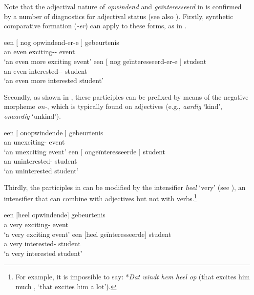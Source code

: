 \documentclass[output=paper]{langsci/langscibook}
\begin{document}
Note that the adjectival nature of \emph{opwindend} and \emph{geïnteresseerd}
in  is confirmed by a number of diagnostics for adjectival
status (see also \citealt{Broekhuis2013}). Firstly, synthetic comparative
formation (\emph{-er}) can apply to these forms, as in .

\ea%
    \label{ex:key:18.27}
	\ea
	\gll  een [ nog    opwindend-er-e ]            gebeurtenis\\
    an {} even    exciting-\Cmpr-\Agr{} {} event\\
	\glt ‘an even more exciting event’
	\ex
	\gll  een  [ nog  geïnteresseerd-er-e ]        student\\
    an {} even  interested-\Cmpr-\Agr{} {}  student\\
	\glt ‘an even more interested student’
	\z
\z

Secondly, as shown in , these participles can be prefixed by
means of the negative morpheme \emph{on-}, which is typically found on
adjectives (e.g., \emph{aardig} \enquote*{kind}, \emph{onaardig}
\enquote*{unkind}).\newpage

\ea%
    \label{ex:key:18.28}
	\ea
	\gll  een [ onopwindende ]  gebeurtenis\\
    an {} unexciting-\Agr{} {}   event\\
	\glt ‘an unexciting event’
	\ex
	\gll  een [ ongeïnteresseerde ]  student\\
    an {} uninterested-\Agr{} {}   student\\
	\glt ‘an uninterested student’
	\z
\z

Thirdly, the participles in  can be modified by the intensifier
\emph{heel} ‘very’ (see ), an intensifier that can combine with
adjectives but not with verbs.\footnote{For example, it is impossible to say:
*\emph{Dat windt hem heel op} (that excites him much \Ptcl{},
\enquote*{that excites him a lot}).}

\ea%
    \label{ex:key:18.29}
	\ea
	\gll een    [heel  opwindende]  gebeurtenis\\
		 a        very    exciting-\Agr{}  event\\
	\glt ‘a very exciting event’
	\ex
	\gll  een    [heel  geïnteresseerde]  student\\
		a        very    interested-\Agr{}      student\\
	\glt ‘a very interested student’
	\z
\z
\end{document}
